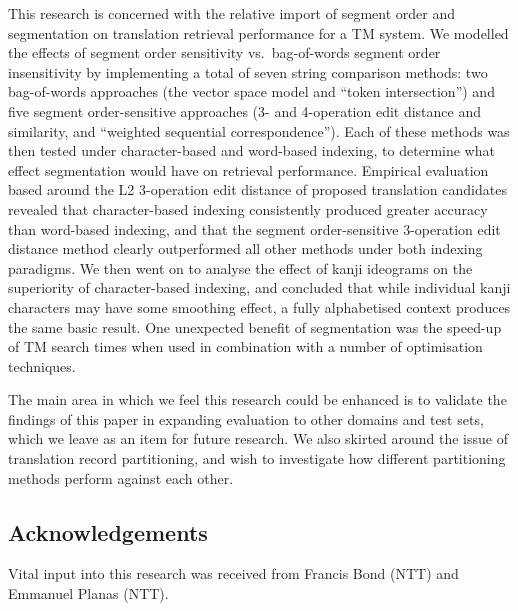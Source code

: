 This research is concerned with the relative import of segment order and
segmentation on translation retrieval performance for a TM system. We
modelled the effects of segment order sensitivity vs.\ bag-of-words
segment order insensitivity by implementing a total of seven string
comparison methods: two bag-of-words approaches (the vector space model
and ``token intersection'') and five segment order-sensitive approaches
(3- and 4-operation edit distance and similarity, and ``weighted
sequential correspondence''). Each of these methods was then tested
under character-based and word-based indexing, to determine what effect
segmentation would have on retrieval performance. Empirical evaluation
based around the L2 3-operation edit distance of proposed translation
candidates revealed that character-based indexing consistently produced
greater accuracy than word-based indexing, and that the segment
order-sensitive 3-operation edit distance method clearly outperformed
all other methods under both indexing paradigms. We then went on to
analyse the effect of kanji ideograms on the superiority of
character-based indexing, and concluded that while individual kanji
characters may have some smoothing effect, a fully alphabetised context
produces the same basic result. One unexpected benefit of segmentation
was the speed-up of TM search times when used in combination with a
number of optimisation techniques.


The main area in which we feel this research could be enhanced is to
validate the findings of this paper in expanding evaluation to other
domains and test sets, which we leave as an item for future research. We 
also skirted around the issue of translation record partitioning, and
wish to investigate how different partitioning methods perform against
each other.


\subsection*{Acknowledgements}

Vital input into this research was received from Francis Bond (NTT) and
Emmanuel Planas (NTT).

